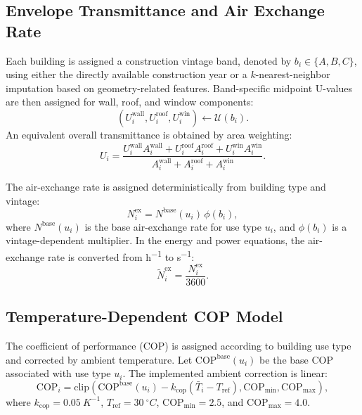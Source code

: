 \documentclass[conference]{IEEEtran}
\begin{document}
\subsection{Envelope Transmittance and Air Exchange Rate}
Each building is assigned a construction vintage band, denoted by $b_i \in \{A, B, C\}$, using either the directly available construction year or a $k$-nearest-neighbor imputation based on geometry-related features. Band-specific midpoint U-values are then assigned for wall, roof, and window components:
\begin{equation}
    \left(U^{\mathrm{wall}}_i, U^{\mathrm{roof}}_i, U^{\mathrm{win}}_i \right) \leftarrow \mathcal{U}(b_i).
\end{equation}
An equivalent overall transmittance is obtained by area weighting:
\begin{equation}
    U_i =
    \frac{
    U^{\mathrm{wall}}_i A^{\mathrm{wall}}_i
    + U^{\mathrm{roof}}_i A^{\mathrm{roof}}_i
    + U^{\mathrm{win}}_i A^{\mathrm{win}}_i
    }{
    A^{\mathrm{wall}}_i + A^{\mathrm{roof}}_i + A^{\mathrm{win}}_i
    }.
\end{equation}

The air-exchange rate is assigned deterministically from building type and vintage:
\begin{equation}
    N^{\mathrm{ex}}_i = N^{\mathrm{base}}(u_i)\,\phi(b_i),
\end{equation}
where $N^{\mathrm{base}}(u_i)$ is the base air-exchange rate for use type $u_i$, and $\phi(b_i)$ is a vintage-dependent multiplier. In the energy and power equations, the air-exchange rate is converted from \si{h^{-1}} to \si{s^{-1}}:
\begin{equation}
    \tilde{N}^{\mathrm{ex}}_i = \frac{N^{\mathrm{ex}}_i}{3600}.
\end{equation}

\subsection{Temperature-Dependent COP Model}
The coefficient of performance (COP) is assigned according to building use type and corrected by ambient temperature. Let $\mathrm{COP}^{\mathrm{base}}(u_i)$ be the base COP associated with use type $u_i$. The implemented ambient correction is linear:
\begin{equation}
    \mathrm{COP}_i =
    \mathrm{clip}
    \left(
    \mathrm{COP}^{\mathrm{base}}(u_i)
    - k_{\mathrm{cop}}(\bar{T}_i - T_{\mathrm{ref}}),
    \mathrm{COP}_{\min},
    \mathrm{COP}_{\max}
    \right),
\end{equation}
where $k_{\mathrm{cop}}=\SI{0.05}{K^{-1}}$, $T_{\mathrm{ref}}=\SI{30}{^\circ C}$, $\mathrm{COP}_{\min}=2.5$, and $\mathrm{COP}_{\max}=4.0$.
\end{document}
